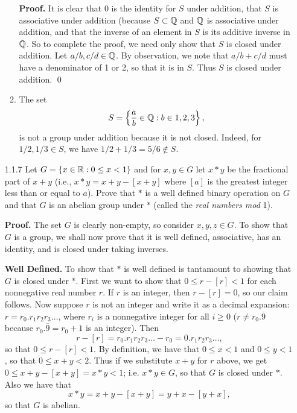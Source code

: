 \begin{enumerate}
\begin{enumerate}
               \textbf{Proof.} It is clear that 0 is the identity for $S$ under
               addition, that $S$ is associative under addition (because
               $S \subset \mathbb{Q}$ and $\mathbb{Q}$ is associative under addition, and that
               the inverse of an element in $S$ is its additive inverse in $\mathbb{Q}$.
               So to complete the proof, we need only show that $S$ is closed
               under addition. Let $a/b, c/d \in \mathbb{Q}$. By observation, we note
               that $a/b + c/d$ must have a denominator of 1 or 2, so that it is
               in $S$. Thus $S$ is closed under addition. \qed
         \item The set
               $$S = \left\{\frac{a}{b} \in \mathbb{Q} : b \in {1, 2, 3} \right\},$$
               is not a group under addition because it is not closed. Indeed,
               for $1/2, 1/3 \in S$, we have $1/2 + 1/3 = 5/6 \notin S$.
      \end{enumerate}
   \item[1.1.7]   Let $G = \{x \in \mathbb{R} : 0 \le x < 1\}$ and for $x, y \in G$ let
                  $x * y$ be the fractional part of $x + y$ (i.e.,
                  $x * y = x + y - [x + y]$ where $[a]$ is the greatest integer
                  less than or equal to $a$). Prove that $*$ is a well defined
                  binary operation on $G$ and that $G$ is an abelian group under
                  $*$ (called the \textit{real numbers mod }1).
                  
      \textbf{Proof.} The set $G$ is clearly non-empty, so consider
      $x, y, z \in G$. To show that $G$ is a group, we shall now prove that it 
      is well defined, associative, has an identity, and is closed under taking
      inverses.

      \textbf{Well Defined.} To show that $*$ is well defined is tantamount to
      showing that $G$ is closed under $*$.  First we want to show that
      $0 \le r - [r] < 1$ for each nonnegative real number $r$. If $r$ is an
      integer, then $r - [r] = 0$, so our claim follows. Now suppose $r$ is not
      an integer and write it as a decimal expansion: $r = r_0.r_1r_2r_3\ldots$,
      where $r_i$ is a nonnegative integer for all $i \ge 0$
      ($r \neq r_0.\overline{9}$ because $r_0.\overline{9} = r_0 + 1$ is an 
      integer). Then
      $$r - [r] = r_0.r_1r_2r_3\ldots - r_0 = 0.r_1r_2r_3\ldots,$$
      so that $0 \le r - [r] < 1$. By definition, we have that
      $0 \le x < 1$ and $0 \le y < 1$, so that $0 \le x + y < 2$. Thus if we
      substitute $x + y$ for $r$ above, we get
      $0 \le x + y  - [x + y] = x * y < 1$; i.e. $x * y \in G$, so that $G$ 
      is closed under $*$. Also we have that
      $$x * y = x + y - [x + y] = y + x - [y + x],$$
      so that $G$ is abelian.


\end{enumerate}
